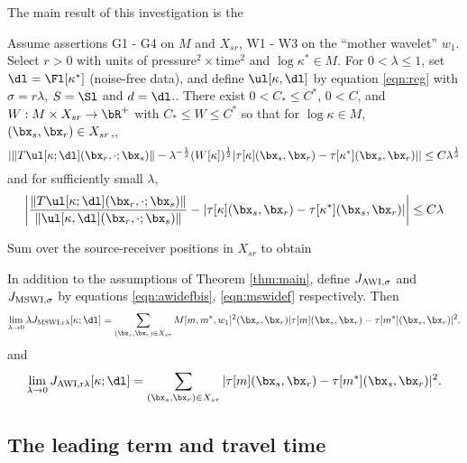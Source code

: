 The main result of this investigation is the

\begin{theorem}
  \label{thm:main}
  Assume assertions G1 - G4 on $M$ and $X_{sr}$, W1 - W3 on the
  ``mother wavelet'' $w_1$. Select $r >0$ with units of
  pressure$^2 \times$time$^2$ and $\log \kappa^* \in M$. For $0 <
  \lambda \le 1$, set
  $\dl=\Fl[\kappa^*]$ (noise-free data), and  define $\ul[\kappa,\dl]$ by
  equation \ref{eqn:reg} with  $\sigma=r\lambda$, $S=\Sl$ and $d=\dl$..
  There exist $0 < C_* \le C^*$, $0 < C$, and $W: M \times X_{sr}
  \rightarrow \bR^+$ with $C_* \le
  W \le C^*$ so that for
  $\log \kappa \in M$, $(\bx_s,\bx_r) \in X_{sr}$,, 
  \begin{equation}
    \label{eqn:mswitt}
    |\|T\ul[\kappa;\dl](\bx_r,\cdot;\bx_s)\|- \lambda^{-\frac{1}{2}} (W[\kappa])^{\frac{1}{2}}|\tau[\kappa](\bx_s,\bx_r)-\tau[\kappa^*](\bx_s,\bx_r)|| \le C
  \lambda^{\frac{1}{2}}
\end{equation}
and for sufficiently small $\lambda$, 
\begin{equation}
  \label{eqn:awitt}
  \left|\frac{\|T\ul[\kappa;\dl](\bx_r,\cdot;\bx_s)\|}{\|\ul[\kappa,\dl](\bx_r,\cdot;\bx_s)\|}-
    |\tau[\kappa](\bx_s,\bx_r)-\tau[\kappa^*](\bx_s,\bx_r)|\right| \le C \lambda
  \end{equation}
\end{theorem}

Sum over the source-receiver positions in $X_{sr}$ to obtain
\begin{cor}
  \label{thm:cor1}
  In addition to the assumptions of Theorem \ref{thm:main}, define $J_{\rm
    AWI,\sigma}$ and $J_{\rm MSWI,\sigma}$ by equations
  \ref{eqn:awidefbis}, \ref{eqn:mswidef} respectively. Then
\begin{equation}
\label{eqn:cor1mswi}   
\lim_{\lambda \rightarrow 0} \lambda J_{\rm MSWI,r\lambda}[\kappa;\dl]
= \sum_{(\bx_s,\bx_r) \in X_{sr}} M[m,m^*,w_1]^2(\bx_s,\bx_r) |\tau[m](\bx_s,\bx_r) - \tau[m^*](\bx_s,\bx_r)|^2.
\end{equation}
and
\begin{equation}
\label{eqn:cor1awi}   
\lim_{\lambda \rightarrow 0} J_{\rm AWI,r\lambda}[\kappa;\dl]
= \sum_{(\bx_s,\bx_r) \in X_{sr}}  |\tau[m](\bx_s,\bx_r) - \tau[m^*](\bx_s,\bx_r)|^2.
\end{equation}
\end{cor}

\subsection{The leading term and travel time}

